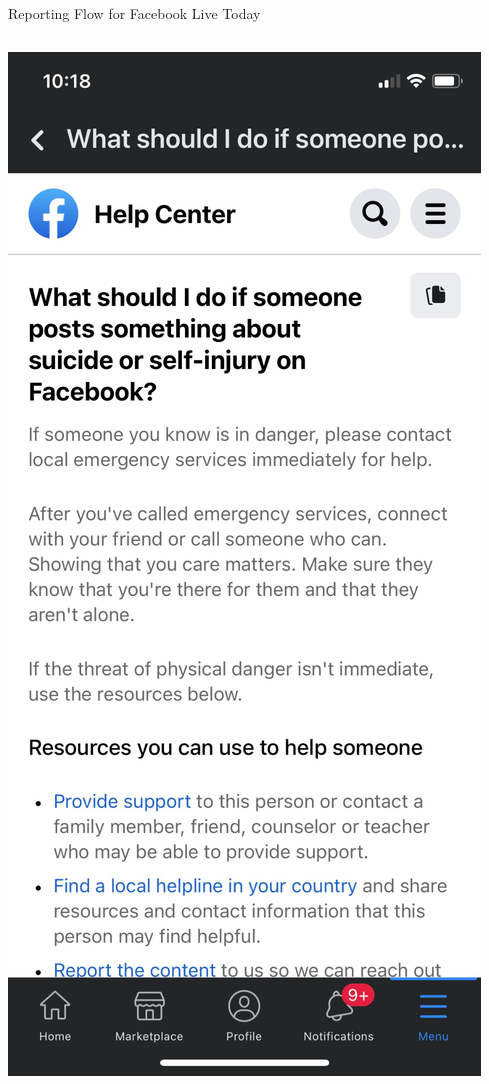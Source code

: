 \documentclass[nobackground,dvipsnames,table]{beamer}
\begin{document}
\begin{frame}{Reporting Flow for Facebook Live Today}
\begin{columns}
            \includegraphics[width=\textwidth]{facebook-live-current-reporting-flow-4}
    \end{columns}
\end{frame}
\end{document}

